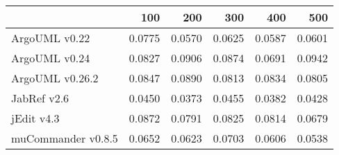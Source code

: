 \begin{tabular}{lrrrrr}
\toprule
{} &    100 &    200 &    300 &    400 &    500 \\
\midrule
ArgoUML v0.22      & 0.0775 & 0.0570 & 0.0625 & 0.0587 & 0.0601 \\
ArgoUML v0.24      & 0.0827 & 0.0906 & 0.0874 & 0.0691 & 0.0942 \\
ArgoUML v0.26.2    & 0.0847 & 0.0890 & 0.0813 & 0.0834 & 0.0805 \\
JabRef v2.6        & 0.0450 & 0.0373 & 0.0455 & 0.0382 & 0.0428 \\
jEdit v4.3         & 0.0872 & 0.0791 & 0.0825 & 0.0814 & 0.0679 \\
muCommander v0.8.5 & 0.0652 & 0.0623 & 0.0703 & 0.0606 & 0.0538 \\
\bottomrule
\end{tabular}
